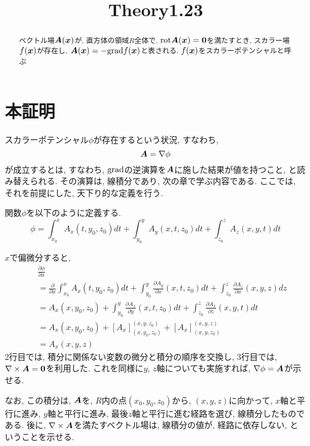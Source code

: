 \documentclass{jsarticle}
\title{Theory1.23}
\newcommand*{\mbold}[1]{\mbox{\boldmath $#1$}}
\newcommand*{\grad}{{\rm grad}}
\newcommand*{\rot}{{\rm rot}}
\begin{document}
\maketitle

\begin{abstract}
  ベクトル場$\mbold{A}(\mbold{x})$が, 直方体の領域$R$全体で, $\rot \mbold{A}(\mbold{x}) = \mbold{0}$を満たすとき, スカラー場$f(\mbold{x})$が存在し, 
  $\mbold{A}(\mbold{x}) = - \grad f(\mbold{x})$と表される. 
  $f(\mbold{x})$をスカラーポテンシャルと呼ぶ
\end{abstract}

\section*{本証明}
スカラーポテンシャル$\phi$が存在するという状況, すなわち, 
\begin{equation}
  \mbold{A} = \nabla\phi
\end{equation}
が成立するとは, すなわち, $\grad$の逆演算を$\mbold{A}$に施した結果が値を持つこと, と読み替えられる. 
その演算は, 線積分であり, 次の章で学ぶ内容である. 
ここでは, それを前提にした, 天下り的な定義を行う. 

関数$\phi$を以下のように定義する. 
\begin{equation}
  \phi = \int_{x_0}^x A_x(t, y_0, z_0)dt + \int_{y_0}^y A_y(x, t, z_0)dt + \int_{z_0}^z A_z(x, y, t)dt
\end{equation}

$x$で偏微分すると, 
\begin{eqnarray}
  && \frac{\partial \phi}{\partial x} \nonumber \\
  && = \frac{\partial}{\partial x}\int_{x_0}^x A_x(t, y_0, z_0)dt + \int_{y_0}^y \frac{\partial A_y}{\partial x}(x, t, z_0)dt + \int_{z_0}^z \frac{\partial A_z}{\partial x}(x, y, z)dz \nonumber \\
  && = A_x(x, y_0, z_0) + \int_{y_0}^y \frac{\partial A_x}{\partial y}(x, t, z_0)dt + \int_{z_0}^z \frac{\partial A_x}{\partial z}(x, y, t)dt \nonumber \\
  && = A_x(x, y_0, z_0) + [A_x]^{(x, y, z_0)}_{(x, y_0, z_0)} + [A_x]^{(x, y, z)}_{(x, y, z_0)} \nonumber\\
  && = A_x(x, y, z)
\end{eqnarray}
2行目では, 積分に関係ない変数の微分と積分の順序を交換し, 3行目では, $\nabla \times \mbold{A} = \mbold{0}$を利用した. 
これを同様に$y$, $z$軸についても実施すれば, $\nabla \phi = \mbold{A}$が示せる. 

なお, この積分は, $\mbold{A}$を, $R$内の点$(x_0, y_0, z_0)$から, $(x, y, z)$に向かって, $x$軸と平行に進み, $y$軸と平行に進み, 最後$z$軸と平行に進む経路を選び, 線積分したものである. 
後に, $\nabla \times \mbold{A}$を満たすベクトル場は, 線積分の値が, 経路に依存しない, ということを示せる.
\end{document}
